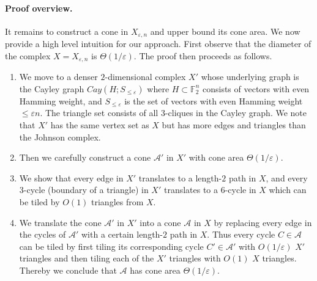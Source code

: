 \documentclass[10pt,a4paper]{article}
\theoremstyle{definition}
\theoremstyle{remark}
\newcommand{\F}{\mathbb{F}}
\renewcommand{\le}{\leqslant}
\let\epsilon=\varepsilon
\numberwithin{equation}{section}
\let\origparagraph\paragraph
\renewcommand{\paragraph}[1]{\origparagraph{#1.}}
\begin{document}
\paragraph{Proof overview}It remains to construct a cone in $X_{\varepsilon,n}$ and upper bound its cone area. We now provide a high level intuition for our approach. 
First observe that the diameter of the complex $X=X_{\epsilon,n}$ is $\Theta(1/\epsilon)$.
The proof then proceeds as follows. 
\begin{enumerate}
    \item  We move to a denser $2$-dimensional complex $X'$ whose underlying graph is the Cayley graph $Cay(H; S_{\le \varepsilon})$ where $H\subset \F_2^n$ consists of vectors with even Hamming weight, and $S_{\le \varepsilon}$ is the set of vectors with even Hamming weight $\le \varepsilon n$. The triangle set consists of all $3$-cliques in the Cayley graph. We note that $X'$ has the same vertex set as $X$ but has more edges and triangles than the Johnson complex.
    
    \item Then we carefully construct a cone $\mathcal{A}'$ in $X'$ with cone area $\Theta(1/\epsilon)$.

    \item We show that every edge in $X'$ translates to a length-$2$ path in $X$, and every $3$-cycle (boundary of a triangle) in $X'$ translates to a $6$-cycle in $X$ which can be tiled by $O(1)$ triangles from $X$. 

    \item We translate the cone $\mathcal{A}'$ in $X'$ into a cone $\mathcal{A}$ in $X$ by replacing every edge in the cycles of $\mathcal{A}'$ with a certain length-$2$ path in $X$. Thus every cycle $C \in \mathcal{A}$ can be tiled by first tiling its corresponding cycle $C' \in \mathcal{A}'$ with $O(1/\epsilon)$ $X'$ triangles and then tiling each of the $X'$ triangles with $O(1)$ $X$ triangles. Thereby we conclude that $\mathcal{A}$ has cone area $\Theta(1/\epsilon)$.
\end{enumerate}
\end{document}
